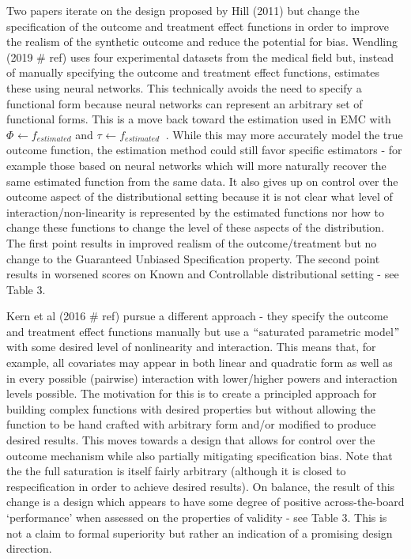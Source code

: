 \documentclass[../main.tex]{subfiles}
\begin{document}
\vspace{\baselineskip}
Two papers iterate on the design proposed by Hill (2011) but change the specification of the outcome and treatment effect functions in order to improve the realism of the synthetic outcome and reduce the potential for bias. Wendling (2019 $\#$ ref) uses four experimental datasets from the medical field but, instead of manually specifying the outcome and treatment effect functions, estimates these using neural networks. This technically avoids the need to specify a functional form because neural networks can represent an arbitrary set of functional forms. This is a move back toward the estimation used in EMC with  \(  \Phi _{} \leftarrow f_{estimated} \)  and  \(  \tau_{} \leftarrow f_{estimated}~ \) . While this may more accurately model the true outcome function, the estimation method could still favor specific estimators - for example those based on neural networks which will more naturally recover the same estimated function from the same data. It also gives up on control over the outcome aspect of the distributional setting because it is not clear what level of interaction/non-linearity is represented by the estimated functions nor how to change these functions to change the level of these aspects of the distribution. The first point results in improved realism of the outcome/treatment but no change to the Guaranteed Unbiased Specification property. The second point results in worsened scores on Known and Controllable distributional setting - see Table 3.\par


\vspace{\baselineskip}
Kern et al (2016 $\#$ ref) pursue a different approach - they specify the outcome and treatment effect functions manually but use a $``$saturated parametric model$"$  with some desired level of nonlinearity and interaction. This means that, for example, all covariates may appear in both linear and quadratic form as well as in every possible (pairwise) interaction with lower/higher powers and interaction levels possible. The motivation for this is to create a principled approach for building complex functions with desired properties but without allowing the function to be hand crafted with arbitrary form and/or modified to produce desired results. This moves towards a design that allows for control over the outcome mechanism while also partially mitigating specification bias. Note that the the full saturation is itself fairly arbitrary (although it is closed to respecification in order to achieve desired results). On balance, the result of this change is a design which appears to have some degree of positive across-the-board ‘performance’ when assessed on the properties of validity - see Table 3. This is not a claim to formal superiority but rather an indication of a promising design direction.\par
\end{document}
